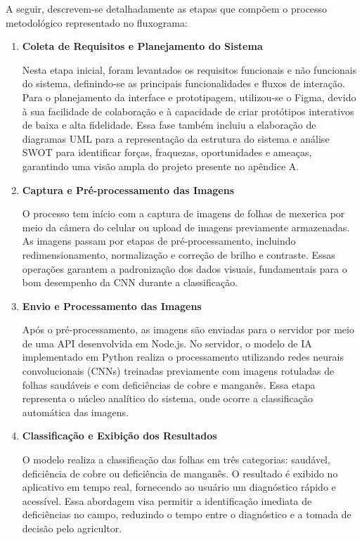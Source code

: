 A seguir, descrevem-se detalhadamente as etapas que compõem o processo metodológico representado no fluxograma:

\begin{enumerate}
\item \textbf{Coleta de Requisitos e Planejamento do Sistema}

Nesta etapa inicial, foram levantados os requisitos funcionais e não funcionais do sistema, definindo-se as principais funcionalidades e fluxos de interação. Para o planejamento da interface e prototipagem, utilizou-se o Figma, devido à sua facilidade de colaboração e à capacidade de criar protótipos interativos de baixa e alta fidelidade. Essa fase também incluiu a elaboração de diagramas UML para a representação da estrutura do sistema e análise SWOT para identificar forças, fraquezas, oportunidades e ameaças, garantindo uma visão ampla do projeto presente no apêndice A.

\item \textbf{Captura e Pré-processamento das Imagens}

O processo tem início com a captura de imagens de folhas de mexerica por meio da câmera do celular ou upload de imagens previamente armazenadas. As imagens passam por etapas de pré-processamento, incluindo redimensionamento, normalização e correção de brilho e contraste. Essas operações garantem a padronização dos dados visuais, fundamentais para o bom desempenho da CNN durante a classificação.

\item \textbf{Envio e Processamento das Imagens}

Após o pré-processamento, as imagens são enviadas para o servidor por meio de uma API desenvolvida em Node.js. No servidor, o modelo de IA implementado em Python realiza o processamento utilizando redes neurais convolucionais (CNNs) treinadas previamente com imagens rotuladas de folhas saudáveis e com deficiências de cobre e manganês. Essa etapa representa o núcleo analítico do sistema, onde ocorre a classificação automática das imagens.

\item \textbf{Classificação e Exibição dos Resultados}

O modelo realiza a classificação das folhas em três categorias: saudável, deficiência de cobre ou deficiência de manganês. O resultado é exibido no aplicativo em tempo real, fornecendo ao usuário um diagnóstico rápido e acessível. Essa abordagem visa permitir a identificação imediata de deficiências no campo, reduzindo o tempo entre o diagnóstico e a tomada de decisão pelo agricultor.


\end{enumerate}
